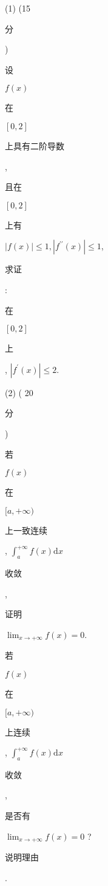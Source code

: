\documentclass[10pt]{article}
\begin{document}
(1) (15 \begin{CJK}{UTF8}{mj}分\end{CJK}) \begin{CJK}{UTF8}{mj}设\end{CJK} $f(x)$ \begin{CJK}{UTF8}{mj}在\end{CJK} $[0,2]$ \begin{CJK}{UTF8}{mj}上具有二阶导数\end{CJK}, \begin{CJK}{UTF8}{mj}且在\end{CJK} $[0,2]$ \begin{CJK}{UTF8}{mj}上有\end{CJK} $|f(x)| \leqslant 1,\left|f^{\prime \prime}(x)\right| \leqslant 1$, \begin{CJK}{UTF8}{mj}求证\end{CJK}: \begin{CJK}{UTF8}{mj}在\end{CJK} $[0,2]$ \begin{CJK}{UTF8}{mj}上\end{CJK}, $\left|f^{\prime}(x)\right| \leqslant 2$.

(2) ( 20 \begin{CJK}{UTF8}{mj}分\end{CJK}) \begin{CJK}{UTF8}{mj}若\end{CJK} $f(x)$ \begin{CJK}{UTF8}{mj}在\end{CJK} $[a,+\infty)$ \begin{CJK}{UTF8}{mj}上一致连续\end{CJK}, $\int_{a}^{+\infty} f(x) \mathrm{d} x$ \begin{CJK}{UTF8}{mj}收敛\end{CJK}, \begin{CJK}{UTF8}{mj}证明\end{CJK} $\lim _{x \rightarrow+\infty} f(x)=0$.

\begin{CJK}{UTF8}{mj}若\end{CJK} $f(x)$ \begin{CJK}{UTF8}{mj}在\end{CJK} $[a,+\infty)$ \begin{CJK}{UTF8}{mj}上连续\end{CJK}, $\int_{a}^{+\infty} f(x) \mathrm{d} x$ \begin{CJK}{UTF8}{mj}收敛\end{CJK}, \begin{CJK}{UTF8}{mj}是否有\end{CJK} $\lim _{x \rightarrow+\infty} f(x)=0$ ? \begin{CJK}{UTF8}{mj}说明理由\end{CJK}.
\end{document}
